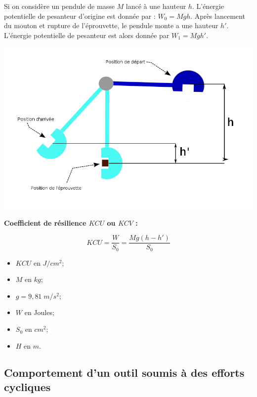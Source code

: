 \documentclass[11pt,oneside]{article}
\begin{document}
\begin{minipage}[c]{.45\linewidth}
Si on considère un pendule de masse $M$ lancé à une hauteur $h$. L'énergie potentielle de pesanteur d'origine est donnée par : $W_0 = Mgh$. Après lancement du mouton et rupture de l'éprouvette, le pendule monte a une hauteur $h'$. L'énergie potentielle de pesanteur est alors donnée par $W_1=Mgh'$.
\end{minipage} \hfill
\begin{minipage}[c]{.45\linewidth}
\begin{center}
\includegraphics[width=.9\textwidth]{png/charpy_2}

\end{center}
\end{minipage}

\begin{resultat}
\textbf{Coefficient de résilience $KCU$ ou $KCV$ :}

$$KCU = \dfrac{W}{S_0} = \dfrac{Mg\left(h-h' \right)}{S_0}$$
\begin{itemize}
\item $KCU$ en $J/cm^2$;
\item $M$ en $kg$;
\item $g=9,81\;m/s^2$;
\item $W$ en Joules;
\item $S_0$ en $cm^2$;
\item $H$ en $m$.
\end{itemize}


\end{resultat}
 
\subsection{Comportement d'un outil soumis à des efforts cycliques}
\end{document}
